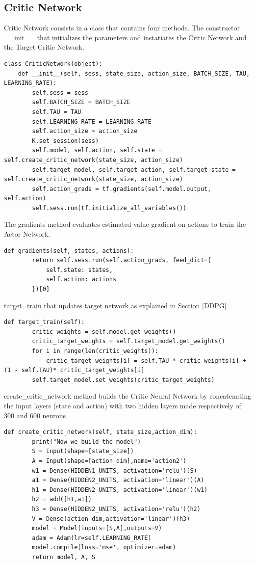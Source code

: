\documentclass[Lau,oneside,noexaminfo]{sapthesis} %
\begin{document}
\subsection{Critic Network}
Critic Network consists in a class that contains four methods.
The constructor \_\_init\_\_ that initializes the parameters and instatiates the Critic Network and the Target Critic Network.
\begin{lstlisting}
class CriticNetwork(object):
    def __init__(self, sess, state_size, action_size, BATCH_SIZE, TAU, LEARNING_RATE):
        self.sess = sess
        self.BATCH_SIZE = BATCH_SIZE
        self.TAU = TAU
        self.LEARNING_RATE = LEARNING_RATE
        self.action_size = action_size
        K.set_session(sess)
        self.model, self.action, self.state = self.create_critic_network(state_size, action_size)  
        self.target_model, self.target_action, self.target_state = self.create_critic_network(state_size, action_size)  
        self.action_grads = tf.gradients(self.model.output, self.action)
        self.sess.run(tf.initialize_all_variables())
\end{lstlisting}
The gradients method evaluates estimated value gradient on actions to train the Actor Network.
\begin{lstlisting}[firstnumber=13]
    def gradients(self, states, actions):
        return self.sess.run(self.action_grads, feed_dict={
            self.state: states,
            self.action: actions
        })[0]
\end{lstlisting}
target\_train that updates target network as explained in Section \ref{DDPG}
\begin{lstlisting}[firstnumber=18]
    def target_train(self):
        critic_weights = self.model.get_weights()
        critic_target_weights = self.target_model.get_weights()
        for i in range(len(critic_weights)):
            critic_target_weights[i] = self.TAU * critic_weights[i] + (1 - self.TAU)* critic_target_weights[i]
        self.target_model.set_weights(critic_target_weights)
\end{lstlisting}
create\_critic\_network method builds the Critic Neural Network by concatenating the input layers (state and action) with two hidden layers made respectively of 300 and 600 neurons.
\begin{lstlisting}[firstnumber=24]
    def create_critic_network(self, state_size,action_dim):
        print("Now we build the model")
        S = Input(shape=[state_size])  
        A = Input(shape=[action_dim],name='action2')   
        w1 = Dense(HIDDEN1_UNITS, activation='relu')(S)
        a1 = Dense(HIDDEN2_UNITS, activation='linear')(A) 
        h1 = Dense(HIDDEN2_UNITS, activation='linear')(w1)
        h2 = add([h1,a1])    
        h3 = Dense(HIDDEN2_UNITS, activation='relu')(h2)
        V = Dense(action_dim,activation='linear')(h3)   
        model = Model(inputs=[S,A],outputs=V)
        adam = Adam(lr=self.LEARNING_RATE)
        model.compile(loss='mse', optimizer=adam)
        return model, A, S 
\end{lstlisting}
\end{document}
